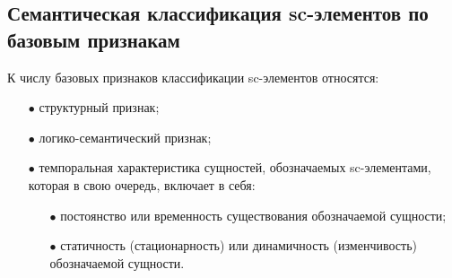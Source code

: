 \newpage
\subsection{Семантическая классификация sc-элементов по базовым признакам}
К числу базовых признаков классификации sc-элементов относятся:
\begin{itemize}
	\item[$\bullet$] структурный признак;
	\item[$\bullet$] логико-семантический признак;
	\item[$\bullet$] темпоральная характеристика сущностей, обозначаемых sc-элементами, которая в свою очередь, включает в себя:
	\begin{itemize}
		\item[$\bullet$] постоянство или временность существования обозначаемой сущности;
		\item[$\bullet$] статичность (стационарность) или динамичность (изменчивость) обозначаемой сущности.
	\end{itemize}
\end{itemize}

